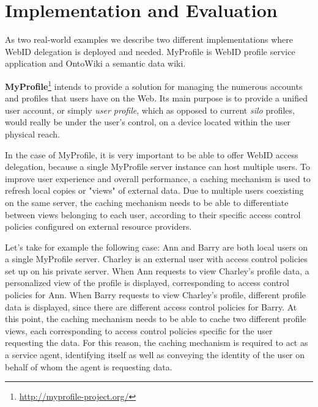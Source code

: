 \documentclass[a4paper]{llncs}
\begin{document}
\section{Implementation and Evaluation}\label{sec:eval}

As two real-world examples we describe two different implementations where WebID delegation is deployed and needed.
MyProfile is WebID profile service application and OntoWiki a semantic data wiki.

\textbf{MyProfile}\footnote{\url{http://myprofile-project.org/}}
intends to provide a solution for managing the numerous accounts and profiles that users have on the Web.
Its main purpose is to provide a unified user account, or simply \textit{user profile}, which as opposed to current \textit{silo} profiles, would really be under the user's control, on a device located within the user physical reach.


In the case of MyProfile, it is very important to be able to offer WebID access delegation, because a single MyProfile server instance can host multiple users.
To improve user experience and overall performance, a caching mechanism is used to refresh local copies or "views" of external data.
Due to multiple users coexisting on the same server, the caching mechanism needs to be able to differentiate between views belonging to each user, according to their specific access control policies configured on external resource providers.

Let's take for example the following case:
Ann and Barry are both local users on a single MyProfile server.
Charley is an external user with access control policies set up on his private server.
When Ann requests to view Charley's profile data, a personalized view of the profile is displayed, corresponding to access control policies for Ann.
When Barry requests to view Charley's profile, different profile data is displayed, since there are different access control policies for Barry.
At this point, the caching mechanism needs to be able to cache two different profile views, each corresponding to access control policies specific for the user requesting the data.
For this reason, the caching mechanism is required to act as a service agent, identifying itself as well as conveying the identity of the user on  behalf of whom the agent is requesting data.
\end{document}
